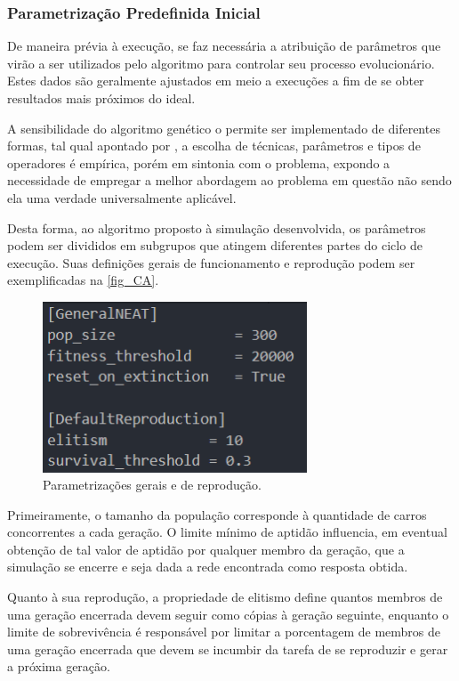 \subsubsection{Parametrização Predefinida Inicial}
De maneira prévia à execução, se faz necessária a atribuição de parâmetros que virão a ser
utilizados pelo algoritmo para controlar seu processo evolucionário. Estes dados são geralmente
ajustados em meio a execuções a fim de se obter resultados mais próximos do ideal.

A sensibilidade do algoritmo genético o permite ser implementado de diferentes formas,
tal qual apontado por , a escolha de técnicas, parâmetros e tipos de operadores
é empírica, porém em sintonia com o problema, expondo a necessidade de empregar a melhor abordagem
ao problema em questão não sendo ela uma verdade universalmente aplicável.

Desta forma, ao algoritmo proposto à simulação desenvolvida, os parâmetros podem ser divididos em
subgrupos que atingem diferentes partes do ciclo de execução. Suas definições gerais de funcionamento
e reprodução podem ser exemplificadas na \autoref{fig_CA}.

\begin{figure}[htb]
        \centering
        \caption{\label{fig_CA}Parametrizações gerais e de reprodução.}
        \includegraphics[width=0.7\textwidth]{images/CA.png}
\end{figure}

Primeiramente, o tamanho da população corresponde à quantidade de carros concorrentes a cada geração.
O limite mínimo de aptidão influencia, em eventual obtenção de tal valor de aptidão por qualquer membro da
geração, que a simulação se encerre e seja dada a rede encontrada como resposta obtida.

Quanto à sua reprodução, a propriedade de elitismo define quantos membros de uma geração encerrada devem
seguir como cópias à geração seguinte, enquanto o limite de sobrevivência é responsável por limitar a
porcentagem de membros de uma geração encerrada que devem se incumbir da tarefa de se reproduzir e gerar a próxima geração.

